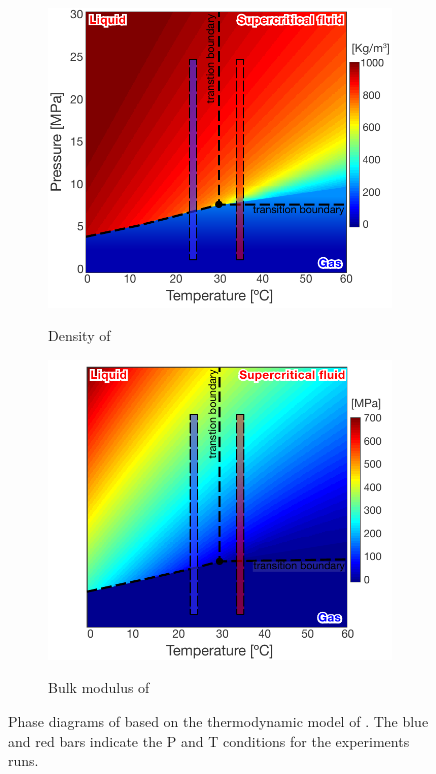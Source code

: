 \begin{figure}[!ht]
        \centering
        \begin{subfigure}[b]{.5\textwidth}
                \caption{Density of }
                \includegraphics[width=\textwidth]{fig/density.pdf}
                \label{fig:density}
        \end{subfigure}%
        \begin{subfigure}[b]{.5\textwidth}
                \caption{Bulk modulus of }
                \includegraphics[width=\textwidth]{fig/bulk.pdf}
                \label{fig:bulk}
        \end{subfigure}
        \caption{Phase diagrams of  based on the thermodynamic model of
\citet{Span1996}. The blue and red bars indicate the P and T conditions for the
experiments runs.}
        \label{fig:bulkdensity}
\end{figure}
